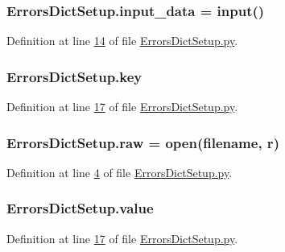 \subsubsection[{\texorpdfstring{input\+\_\+data}{input_data}}]{\setlength{\rightskip}{0pt plus 5cm}Errors\+Dict\+Setup.\+input\+\_\+data = input()}\hypertarget{namespace_errors_dict_setup_a82a4de99ebada6605cb7ca0598ef411e}{}\label{namespace_errors_dict_setup_a82a4de99ebada6605cb7ca0598ef411e}


Definition at line \hyperlink{_errors_dict_setup_8py_source_l00014}{14} of file \hyperlink{_errors_dict_setup_8py_source}{Errors\+Dict\+Setup.\+py}.

\subsubsection[{\texorpdfstring{key}{key}}]{\setlength{\rightskip}{0pt plus 5cm}Errors\+Dict\+Setup.\+key}\hypertarget{namespace_errors_dict_setup_a09c268098d09ffb8e5504f30fa6d5dd9}{}\label{namespace_errors_dict_setup_a09c268098d09ffb8e5504f30fa6d5dd9}


Definition at line \hyperlink{_errors_dict_setup_8py_source_l00017}{17} of file \hyperlink{_errors_dict_setup_8py_source}{Errors\+Dict\+Setup.\+py}.

\subsubsection[{\texorpdfstring{raw}{raw}}]{\setlength{\rightskip}{0pt plus 5cm}Errors\+Dict\+Setup.\+raw = open({\bf filename}, \textquotesingle{}r\textquotesingle{})}\hypertarget{namespace_errors_dict_setup_a71f324cc110ab41d2a588f590fff7481}{}\label{namespace_errors_dict_setup_a71f324cc110ab41d2a588f590fff7481}


Definition at line \hyperlink{_errors_dict_setup_8py_source_l00004}{4} of file \hyperlink{_errors_dict_setup_8py_source}{Errors\+Dict\+Setup.\+py}.

\subsubsection[{\texorpdfstring{value}{value}}]{\setlength{\rightskip}{0pt plus 5cm}Errors\+Dict\+Setup.\+value}\hypertarget{namespace_errors_dict_setup_a4436d6af623cbe45d37493afe4de9461}{}\label{namespace_errors_dict_setup_a4436d6af623cbe45d37493afe4de9461}


Definition at line \hyperlink{_errors_dict_setup_8py_source_l00017}{17} of file \hyperlink{_errors_dict_setup_8py_source}{Errors\+Dict\+Setup.\+py}.

